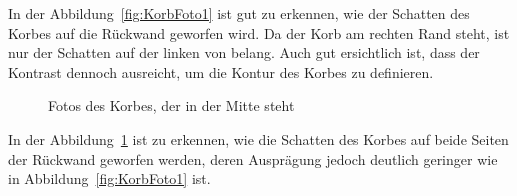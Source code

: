 In der Abbildung~\ref{fig:KorbFoto1} ist gut zu erkennen, wie der Schatten des Korbes auf die 
Rückwand geworfen wird. Da der Korb am rechten Rand steht, ist nur der Schatten auf der linken 
von belang. Auch gut ersichtlich ist, dass der Kontrast dennoch ausreicht, um die Kontur des Korbes zu definieren.
\newpage
%
\begin{figure}[h!]
\hfill
{}
\caption{Fotos des Korbes, der in der Mitte steht}
\label{fig:KorbFoto2}
\end{figure}
In der Abbildung~\ref{fig:KorbFoto2} ist zu erkennen, wie die Schatten des Korbes auf beide Seiten der Rückwand geworfen werden, deren Ausprägung jedoch deutlich geringer wie in Abbildung~\ref{fig:KorbFoto1} ist.






